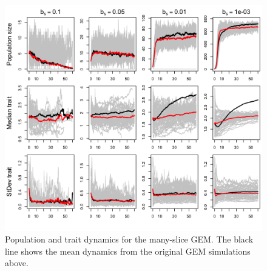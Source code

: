 \documentclass[12pt,reqno,final,pdftex]{amsart}\usepackage[]{graphicx}\usepackage[]{color}
\newenvironment{knitrout}{}{} %
\theoremstyle{plain}
\numberwithin{equation}{part}
\begin{document}
\begin{knitrout}\scriptsize
{}\color{fgcolor}\begin{figure}

\includegraphics[width=\linewidth]{figure/manysliceGEM-1} \hfill{}

\caption[Population and trait dynamics for the many-slice GEM]{Population and trait dynamics for the many-slice GEM. The black line shows the mean dynamics from the original GEM simulations above.}\label{fig:manysliceGEM}
\end{figure}


\end{knitrout}
\end{document}
